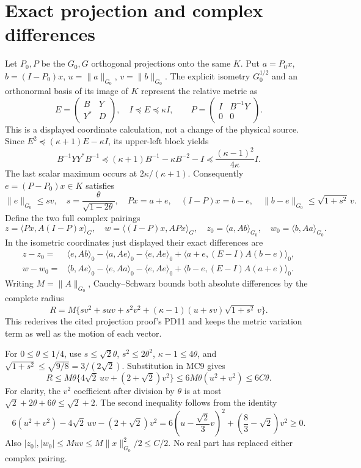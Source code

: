 \documentclass[11pt]{article}
\begin{document}
\section{Exact projection and complex differences}
Let $P_0,P$ be the $G_0,G$ orthogonal projections onto the same $K$.
Put $a=P_0x$, $b=(I-P_0)x$, $u=\|a\|_{G_0}$, $v=\|b\|_{G_0}$.
The explicit isometry $G_0^{1/2}$ and an orthonormal basis of its
image of $K$ represent the relative metric as
\[
 E=\begin{pmatrix}B&Y\\Y^*&D\end{pmatrix},\quad
 I\preceq E\preceq\kappa I,
 \qquad P=\begin{pmatrix}I&B^{-1}Y\\0&0\end{pmatrix}.
\]
This is a displayed coordinate calculation, not a change of the
physical source. Since
$E^2\preceq(\kappa+1)E-\kappa I$, its upper-left block yields
\[
 B^{-1}YY^*B^{-1}\preceq
 (\kappa+1)B^{-1}-\kappa B^{-2}-I
 \preceq\frac{(\kappa-1)^2}{4\kappa}I.
\]
The last scalar maximum occurs at $2\kappa/(\kappa+1)$.
Consequently $e=(P-P_0)x\in K$ satisfies
\[
 \|e\|_{G_0}\le s v,\quad s=\frac{\theta}{\sqrt{1-2\theta}},
 \quad Px=a+e,\quad (I-P)x=b-e,\quad
 \|b-e\|_{G_0}\le\sqrt{1+s^2}\,v.                            \tag{MC7}
\]
Define the two full complex pairings
\[
 z=\langle Px,A(I-P)x\rangle_G,\quad
 w=\langle(I-P)x,APx\rangle_G,
 \quad z_0=\langle a,Ab\rangle_{G_0},\quad
 w_0=\langle b,Aa\rangle_{G_0}.                               \tag{MC8}
\]
In the isometric coordinates just displayed their exact differences are
\begin{align*}
z-z_0={}&\langle e,Ab\rangle_0-\langle a,Ae\rangle_0
 -\langle e,Ae\rangle_0+\langle a+e,(E-I)A(b-e)\rangle_0,\\
w-w_0={}&\langle b,Ae\rangle_0-\langle e,Aa\rangle_0
 -\langle e,Ae\rangle_0+\langle b-e,(E-I)A(a+e)\rangle_0.
\end{align*}
Writing $M=\|A\|_{G_0}$, Cauchy--Schwarz bounds both absolute
differences by the complete radius
\[
 R=M\{sv^2+suv+s^2v^2+
 (\kappa-1)(u+sv)\sqrt{1+s^2}\,v\}.                          \tag{MC9}
\]
This rederives the cited projection proof's PD11 and keeps the metric
variation term as well as the motion of each vector.

For $0\le\theta\le1/4$, use
$s\le\sqrt2\theta$, $s^2\le2\theta^2$,
$\kappa-1\le4\theta$, and
$\sqrt{1+s^2}\le\sqrt{9/8}=3/(2\sqrt2)$.
Substitution in MC9 gives
\[
 R\le M\theta\{4\sqrt2\,uv+(2+\sqrt2)v^2\}
 \le6M\theta(u^2+v^2)\le6C\theta.                           \tag{MC10}
\]
For clarity, the $v^2$ coefficient after division by $\theta$ is
at most $\sqrt2+2\theta+6\theta\le\sqrt2+2$.
The second inequality follows from the identity
\[
 6(u^2+v^2)-4\sqrt2\,uv-(2+\sqrt2)v^2
 =6\left(u-\frac{\sqrt2}{3}v\right)^2
   +\left(\frac83-\sqrt2\right)v^2\ge0.
\]
Also $|z_0|,|w_0|\le Muv\le M\|x\|_{G_0}^2/2\le C/2$.
No real part has replaced either complex pairing.
\end{document}

